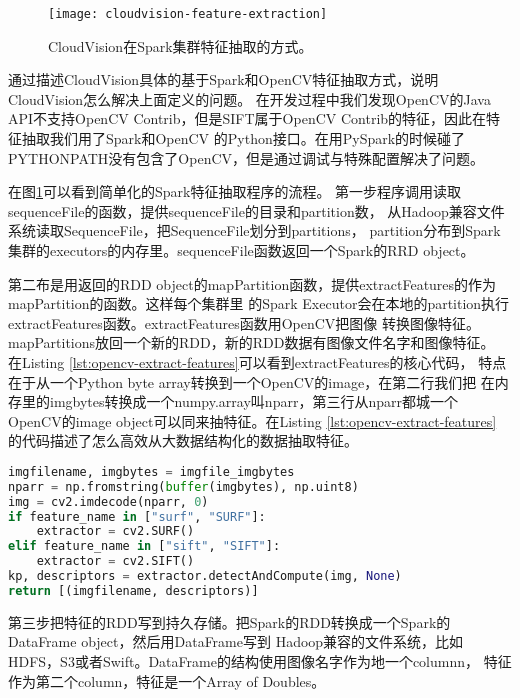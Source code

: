 \begin{figure}[h]
  \centering
    \texttt{[image: cloudvision-feature-extraction]}
  \caption{CloudVision在Spark集群特征抽取的方式。}
  \label{fig:cloudvision-feature-extraction}
\end{figure}
通过描述CloudVision具体的基于Spark和OpenCV特征抽取方式，说明CloudVision怎么解决上面定义的问题。
在开发过程中我们发现OpenCV的Java
API不支持OpenCV Contrib，但是SIFT属于OpenCV Contrib的特征，因此在特征抽取我们用了Spark和OpenCV
的Python接口。在用PySpark的时候碰了PYTHONPATH没有包含了OpenCV，但是通过调试与特殊配置解决了问题。

在图\ref{fig:cloudvision-feature-extraction}可以看到简单化的Spark特征抽取程序的流程。
第一步程序调用读取sequenceFile的函数，提供sequenceFile的目录和partition数，
从Hadoop兼容文件系统读取SequenceFile，把SequenceFile划分到partitions，
partition分布到Spark集群的executors的内存里。sequenceFile函数返回一个Spark的RRD object。

第二布是用返回的RDD object的mapPartition函数，提供extractFeatures的作为mapPartition的函数。这样每个集群里
的Spark Executor会在本地的partition执行extractFeatures函数。extractFeatures函数用OpenCV把图像
转换图像特征。mapPartitions放回一个新的RDD，新的RDD数据有图像文件名字和图像特征。
在Listing \ref{lst:opencv-extract-features}可以看到extractFeatures的核心代码，
特点在于从一个Python byte array转换到一个OpenCV的image，在第二行我们把
在内存里的imgbytes转换成一个numpy.array叫nparr，第三行从nparr都城一个
OpenCV的image object可以同来抽特征。在Listing \ref{lst:opencv-extract-features}
的代码描述了怎么高效从大数据结构化的数据抽取特征。
\begin{lstlisting}[language=Python,
                   basicstyle=\small,
                   showstringspaces=false,
                   caption={OpenCV从内存读取图像抽取特征},
                   label={lst:opencv-extract-features}]
imgfilename, imgbytes = imgfile_imgbytes
nparr = np.fromstring(buffer(imgbytes), np.uint8)
img = cv2.imdecode(nparr, 0)
if feature_name in ["surf", "SURF"]:
    extractor = cv2.SURF()
elif feature_name in ["sift", "SIFT"]:
    extractor = cv2.SIFT()
kp, descriptors = extractor.detectAndCompute(img, None)
return [(imgfilename, descriptors)]
\end{lstlisting}

第三步把特征的RDD写到持久存储。把Spark的RDD转换成一个Spark的DataFrame object，然后用DataFrame写到
Hadoop兼容的文件系统，比如HDFS，S3或者Swift。DataFrame的结构使用图像名字作为地一个columnn，
特征作为第二个column，特征是一个Array of Doubles。

